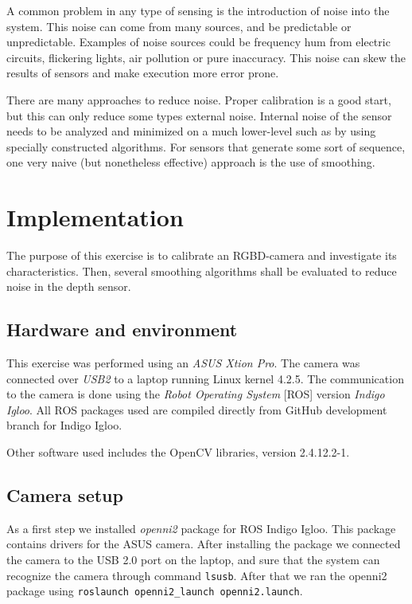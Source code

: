 \documentclass[11pt]{article}
\begin{document}
A common problem in any type of sensing is the introduction of noise into the
system. This noise can come from many sources, and be predictable or
unpredictable. Examples of noise sources could be frequency hum from electric
circuits, flickering lights, air pollution or pure inaccuracy. This noise can
skew the results of sensors and make execution more error prone. \par

There are many approaches to reduce noise. Proper calibration is a good start,
but this can only reduce some types external noise. Internal noise of the sensor
needs to be analyzed and minimized on a much lower-level such as by using
specially constructed algorithms. For sensors that generate some sort of
sequence, one very naive (but nonetheless effective) approach is the use of
smoothing. \par

\section{Implementation}
The purpose of this exercise is to calibrate an RGBD-camera and investigate its
characteristics. Then, several smoothing algorithms shall be evaluated to reduce
noise in the depth sensor.

\subsection{Hardware and environment}
This exercise was performed using an \emph{ASUS Xtion Pro}. The camera was
connected over \emph{USB2} to a laptop running Linux kernel 4.2.5. The
communication to the camera is done using the \emph{Robot Operating System}
[ROS] version \emph{Indigo Igloo}. All ROS packages used are compiled directly
from GitHub development branch for Indigo Igloo. \par
Other software used includes the OpenCV libraries, version 2.4.12.2-1.

\subsection{Camera setup}
As a first step we installed \emph{openni2} package for ROS Indigo Igloo.
This package contains drivers for the ASUS camera. After
installing the package we connected the camera to the USB 2.0 port on the
laptop, and sure that the system can recognize the camera through command
\texttt{lsusb}. After that we ran the openni2 package using \texttt{roslaunch
  openni2\_launch openni2.launch}. \par
\end{document}
